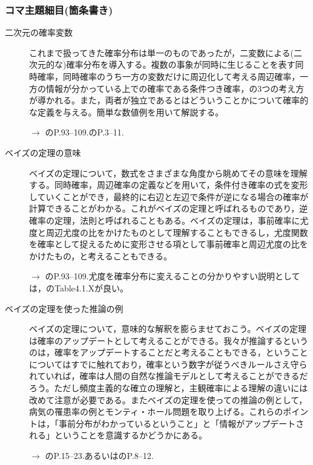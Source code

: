 \subsubsection{コマ主題細目(箇条書き)}
\begin{description}
	\item[二次元の確率変数]これまで扱ってきた確率分布は単一のものであったが，二変数による(二次元的な)確率分布を導入する。複数の事象が同時に生じることを表す同時確率，同時確率のうち一方の変数だけに周辺化して考える周辺確率，一方の情報が分かっている上での確率である条件つき確率，の3つの考え方が導かれる。また，両者が独立であるとはどういうことかについて確率的な定義を与える。簡単な数値例を用いて解説する。
	      \begin{flushright}
		      $\to$ \citet{Maeda2017}のP.93--109.\citet{Toyoda201506}のP.3--11.
	      \end{flushright}

	\item[ベイズの定理の意味] ベイズの定理について，数式をさまざまな角度から眺めてその意味を理解する。同時確率，周辺確率の定義などを用いて，条件付き確率の式を変形していくことができ，最終的に右辺と左辺で条件が逆になる場合の確率が計算できることがわかる。これがベイズの定理と呼ばれるものであり，逆確率の定理，法則と呼ばれることもある。ベイズの定理は，事前確率に尤度と周辺尤度の比をかけたものとして理解することもできるし，尤度関数を確率として捉えるために変形させる項として事前確率と周辺尤度の比をかけたもの，と考えることもできる。
	      \begin{flushright}
		      $\to$ \citet{Maeda2017}のP.93--109.尤度を確率分布に変えることの分かりやすい説明としては，\citet{Lambert201805}のTable4.1.Xが良い。
	      \end{flushright}

	\item[ベイズの定理を使った推論の例]ベイズの定理について，意味的な解釈を膨らませておこう。ベイズの定理は確率のアップデートとして考えることができる。我々が推論するというのは，確率をアップデートすることだと考えることもできる，ということについてはすでに触れており，確率という数字が従うべきルールさえ守られていれば，確率は人間の自然な推論モデルとして考えることができるだろう。ただし頻度主義的な確立の理解と，主観確率による理解の違いには改めて注意が必要である。またベイズの定理を使っての推論の例として，病気の罹患率の例とモンティ・ホール問題を取り上げる。これらのポイントは，「事前分布がわかっているということ」と「情報がアップデートされる」ということを意識するかどうかにある。
	      \begin{flushright}
		      $\to$ \citet{Maeda2017}のP.15--23.あるいは\citet{Toyoda201506}のP.8--12.
	      \end{flushright}

\end{description}
